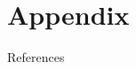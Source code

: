 \documentclass{beamer}
\numberwithin{equation}{section}
\begin{document}
\begin{frame}

\end{frame}

\section{Appendix}
\label{appendix}

\begin{frame}

\end{frame}

\begin{frame}{References}
    
    
\end{frame}
\end{document}
